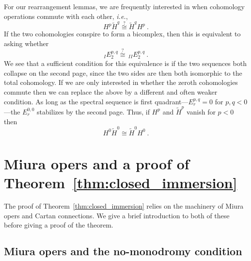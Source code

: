 \documentclass[a4paper]{article}
\def \ie{{\it i.e.}}
\begin{document}
For our rearrangement lemmas, we are frequently interested in when cohomology operations commute with each other, \ie,
\begin{equation}
	H^p\tilde{H}^q\stackrel{?}{\cong}\tilde{H}^qH^p~.
\end{equation}
If the two cohomologies conspire to form a bicomplex, then this is equivalent to asking whether
\begin{equation}
	_IE_2^{p,q}\stackrel{?}{\cong}\,_{II}E_2^{p,q}~.
\end{equation}
We see that a sufficient condition for this equivalence is if the two sequences both collapse on the second page, since the two sides are then both isomorphic to the total cohomology. If we are only interested in whether the zeroth cohomologies commute then we can replace the above by a different and often weaker condition. As long as the spectral sequence is first quadrant---$E_r^{p,q}=0$ for $p,q<0$---the $E^{0,0}_r$ stabilizes by the second page. Thus, if $H^p$ and $\tilde{H}^p$ vanish for $p<0$ then
\begin{equation}
	H^0\tilde{H}^0\cong\tilde{H}^0H^0~.
\end{equation}


\section{\label{sec:proof_closed_immersion}Miura opers and a proof of Theorem~\ref{thm:closed_immersion}}

The proof of Theorem~\ref{thm:closed_immersion} relies on the machinery of Miura opers and Cartan connections. We give a brief introduction to both of these before giving a proof of the theorem.

\subsection{Miura opers and the no-monodromy condition}
\end{document}
